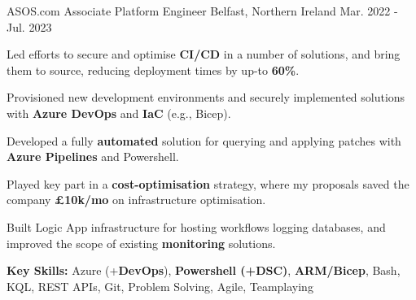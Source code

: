 \begin{cventries}
  \cventry
  	{ASOS.com} %
    {Associate Platform Engineer} %
    {Belfast, Northern Ireland} %
    {Mar. 2022 - Jul. 2023} %
    {
      \begin{cvitems} %
        \item {Led efforts to secure and optimise \textbf{CI/CD} in a number of solutions, and bring them to source, reducing deployment times by up-to \textbf{60\%}.}
        \item {Provisioned new development environments and securely implemented solutions with \textbf{Azure DevOps} and \textbf{IaC} (e.g., Bicep).}
        \item {Developed a fully \textbf{automated} solution for querying and applying patches with \textbf{Azure Pipelines} and Powershell.}
        \item {Played key part in a \textbf{cost-optimisation} strategy, where my proposals saved the company \textbf{\approx £10k/mo} on infrastructure optimisation.}
		    \item {Built Logic App infrastructure for hosting workflows logging databases, and improved the scope of existing \textbf{monitoring} solutions.}
        \item {\textbf{Key Skills:} Azure (+\textbf{DevOps}), \textbf{Powershell (+DSC)}, \textbf{ARM/Bicep}, Bash, KQL, REST APIs, Git, Problem Solving, Agile, Teamplaying}
      \end{cvitems}
    }


\end{cventries}
